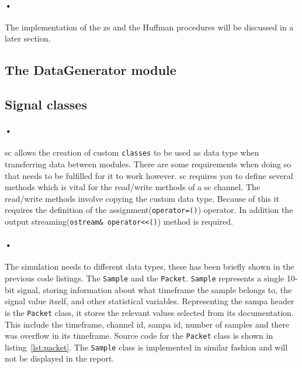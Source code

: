 \documentclass[a4paper, 12pt]{report}
\newcommand{\codeword}[1]{\texttt{#1}}
\begin{document}


\paragraph{•}
The implementation of the \gls{zs} and the Huffman procedures will be discussed in a later section.

\subsection{The DataGenerator module}


\subsection{Signal classes}
\paragraph{•}
\gls{sc} allows the creation of custom \codeword{classes} to be used as data type when transferring data between modules.
There are some requirements when doing so that needs to be fulfilled for it to work however.
\gls{sc} requires you to define several methods which is vital for the read/write methods of a \gls{sc} channel.
The read/write methods involve copying the custom data type.
Because of this it requires the definition of the assignment(\codeword{operator=()}) operator.
In addition the output streaming(\codeword{ostream\& operator<<()}) method is required. 

\paragraph{•}
The simulation needs to different data types, these has been briefly shown in the previous code listings.
The \codeword{Sample} and the \codeword{Packet}.
\codeword{Sample} represents a single 10-bit signal, storing information about what timeframe the sample belongs to, the signal value itself, and other statistical variables.
Representing the \gls{sampa} header is the \codeword{Packet} class, it stores the relevant values selected from its documentation.
This include the timeframe, channel id, sampa id, number of samples and there was overflow in its timeframe.
Source code for the \codeword{Packet} class is shown in listing~\ref{lst:packet}.
The \codeword{Sample} class is implemented in similar fashion and will not be displayed in the report. 
\end{document}
